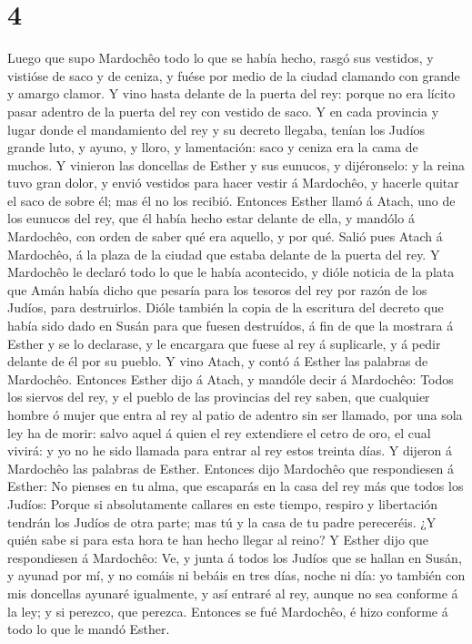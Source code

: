 \hypertarget{section-3}{%
\section{4}\label{section-3}}

 Luego que supo Mardochêo todo lo que se había hecho,
rasgó sus vestidos, y vistióse de saco y de ceniza, y fuése por medio de
la ciudad clamando con grande y amargo clamor.  Y vino
hasta delante de la puerta del rey: porque no era lícito pasar adentro
de la puerta del rey con vestido de saco.  Y en cada
provincia y lugar donde el mandamiento del rey y su decreto llegaba,
tenían los Judíos grande luto, y ayuno, y lloro, y lamentación: saco y
ceniza era la cama de muchos.  Y vinieron las doncellas de
Esther y sus eunucos, y dijéronselo: y la reina tuvo gran dolor, y envió
vestidos para hacer vestir á Mardochêo, y hacerle quitar el saco de
sobre él; mas él no los recibió.  Entonces Esther llamó á
Atach, uno de los eunucos del rey, que él había hecho estar delante de
ella, y mandólo á Mardochêo, con orden de saber qué era aquello, y por
qué.  Salió pues Atach á Mardochêo, á la plaza de la
ciudad que estaba delante de la puerta del rey.  Y
Mardochêo le declaró todo lo que le había acontecido, y dióle noticia de
la plata que Amán había dicho que pesaría para los tesoros del rey por
razón de los Judíos, para destruirlos.  Dióle también la
copia de la escritura del decreto que había sido dado en Susán para que
fuesen destruídos, á fin de que la mostrara á Esther y se lo declarase,
y le encargara que fuese al rey á suplicarle, y á pedir delante de él
por su pueblo.  Y vino Atach, y contó á Esther las
palabras de Mardochêo.  Entonces Esther dijo á Atach, y
mandóle decir á Mardochêo:  Todos los siervos del rey, y
el pueblo de las provincias del rey saben, que cualquier hombre ó mujer
que entra al rey al patio de adentro sin ser llamado, por una sola ley
ha de morir: salvo aquel á quien el rey extendiere el cetro de oro, el
cual vivirá: y yo no he sido llamada para entrar al rey estos treinta
días.  Y dijeron á Mardochêo las palabras de Esther.
 Entonces dijo Mardochêo que respondiesen á Esther: No
pienses en tu alma, que escaparás en la casa del rey más que todos los
Judíos:  Porque si absolutamente callares en este tiempo,
respiro y libertación tendrán los Judíos de otra parte; mas tú y la casa
de tu padre pereceréis. ¿Y quién sabe si para esta hora te han hecho
llegar al reino?  Y Esther dijo que respondiesen á
Mardochêo:  Ve, y junta á todos los Judíos que se hallan
en Susán, y ayunad por mí, y no comáis ni bebáis en tres días, noche ni
día: yo también con mis doncellas ayunaré igualmente, y así entraré al
rey, aunque no sea conforme á la ley; y si perezco, que perezca.
 Entonces se fué Mardochêo, é hizo conforme á todo lo que
le mandó Esther.

